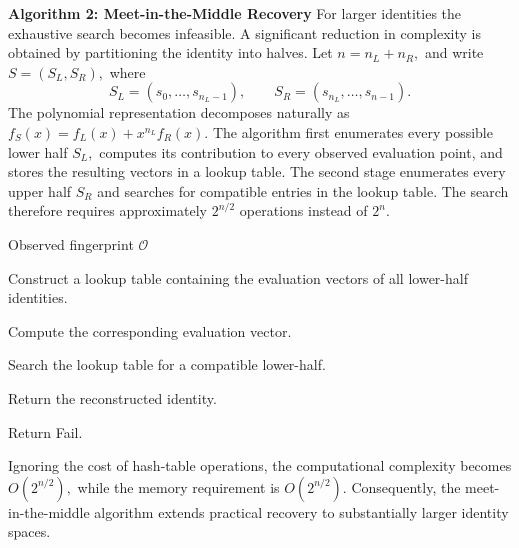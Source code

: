 \documentclass[a4paper,11pt]{llncs}
\begin{document}
\noindent
{\bf Algorithm 2: Meet-in-the-Middle Recovery}
For larger identities the exhaustive search becomes infeasible.
A significant reduction in complexity is obtained by partitioning the
identity into halves.
Let $n=n_L+n_R,$ 
and write
$S=(S_L,S_R),$
where
\[
S_L
=
(s_0,\ldots,s_{n_L-1}),
\qquad
S_R
=
(s_{n_L},\ldots,s_{n-1}).
\]
The polynomial representation decomposes naturally as
$f_S(x)
=
f_L(x)
+
x^{n_L}f_R(x).$
The algorithm first enumerates every possible lower half
$S_L,$
computes its contribution to every observed evaluation point, and stores
the resulting vectors in a lookup table.
The second stage enumerates every upper half
$S_R$ and searches for compatible entries in the lookup table.
The search therefore requires approximately
$2^{n/2}$ operations instead of $2^n$.
%
\begin{algorithm}[H]
\caption{Meet-in-the-Middle Recovery}\label{alg:mitm}
\begin{algorithmic}[1]

\Require
Observed fingerprint
$\mathcal O$

\State Construct a lookup table containing the evaluation vectors of
all lower-half identities.


    \State Compute the corresponding evaluation vector.

    \State Search the lookup table for a compatible lower-half.


        \State Return the reconstructed identity.

    \EndIf

\EndFor

\State Return {\sc Fail}.

\end{algorithmic}
\end{algorithm}
%
Ignoring the cost of hash-table operations, the computational
complexity becomes
$O(2^{n/2}),$
while the memory requirement is
$O(2^{n/2}).$
Consequently, the meet-in-the-middle algorithm extends practical
recovery to substantially larger identity spaces.
\end{document}
